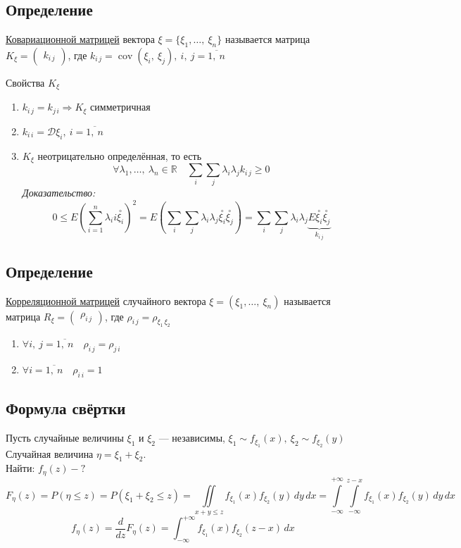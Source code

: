 \documentclass[12pt, a4paper]{article}
\begin{document}
    \subsection*{Определение}
    \underline{Ковариационной матрицей} вектора $\xi = \{\xi_1,\dots,\ \xi_n\}$ называется матрица $K_{\xi} = \begin{pmatrix}
        k_{i\, j}
    \end{pmatrix}$, где $k_{i\, j} = \operatorname{cov}(\xi_i,\ \xi_j),\ i,\ j = \overline{1,\ n}$
    \begin{center}
        Свойства $K_{\xi}$
    \end{center}
    \begin{enumerate}
        \item $k_{i\, j} = k_{j\, i}\Rightarrow K_{\xi}$ симметричная
        \item $k_{i\, i} = \mathcal{D}\xi_{i},\ i = \overline{1,\ n}$
        \item $K_{\xi}$ неотрицательно определённая, то есть 
        \[\forall \lambda_1,\dots,\ \lambda_n\in\mathbb{R}\quad \sum_i\sum_j \lambda_i\lambda_j k_{i\, j} \geq 0\]
        \textit{Доказательство:}
        \[0 \leq E\left(\sum_{i = 1}^{n} \lambda_ii \overset{\circ}{\xi_i}\right)^2 = E\left( \sum_i \sum_j \lambda_i \lambda_j \overset{\circ}{\xi_i}\overset{\circ}{\xi_j} \right) = \sum_i \sum_j \lambda_i \lambda_j \underset{k_{i\, j}}{\underbrace{E\overset{\circ}{\xi_i}\overset{\circ}{\xi_j}}}\]
    \end{enumerate}
    \subsection*{Определение}
    \underline{Корреляционной матрицей} случайного вектора $\xi = (\xi_1,\dots,\ \xi_n)$ называется матрица $R_{\xi} = \begin{pmatrix}
        \rho_{i\, j}
    \end{pmatrix}$, где $\rho_{i\, j} = \rho_{\xi_1\, \xi_2}$
    \begin{enumerate}
        \item $\forall i,\ j = \overline{1,\ n}\quad \rho_{i\, j} = \rho_{j\, i}$
        \item $\forall i = \overline{1,\ n}\quad \rho_{i\, i} = 1$
    \end{enumerate}
    \subsection*{Формула свёртки}
    Пусть случайные величины $\xi_1$ и $\xi_2$ --- независимы, $\xi_1\sim f_{\xi_1}(x),\ \xi_2 \sim f_{\xi_2}(y)$\\
    Случайная величина $\eta = \xi_1 + \xi_2$.\\
    Найти: $f_{\eta}(z) - ?$
    \[F_{\eta}(z) = P(\eta \leq z) = P(\xi_1 + \xi_2 \leq z) = \iint\limits_{x + y \leq z} f_{\xi_1}(x) f_{\xi_2}(y)\, dy\, dx = \int\limits_{-\infty}^{+\infty}\int\limits_{-\infty}^{z - x} f_{\xi_1}(x) f_{\xi_2}(y)\, dy\, dx\]
    \[f_{\eta}(z) = \frac{d}{dz} F_{\eta}(z) = \int_{-\infty}^{+\infty} f_{\xi_1}(x)f_{\xi_2}(z - x)\, dx\]
\end{document}
